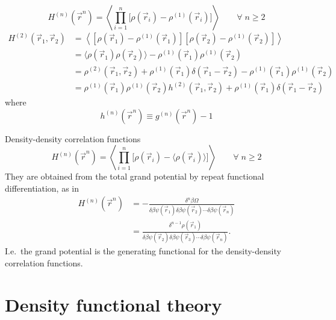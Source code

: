 \documentclass[12pt]{report}
\begin{document}
\begin{equation}
  H^{(n)}(\vec{r}^n) =
  \left\langle
  \prod_{i=1}^n
  \Big[ \rho(\vec{r}_i) - \rho^{(1)}(\vec{r}_i) \Big]
  \right\rangle
  \qquad \forall \; n \ge 2
\end{equation}
\begin{equation}
  \begin{aligned}
    H^{(2)}(\vec{r}_1, \vec{r}_2) &=
    \left\langle
    \left[ \rho(\vec{r}_1) - \rho^{(1)}(\vec{r}_1) \right]
    \left[ \rho(\vec{r}_2) - \rho^{(1)}(\vec{r}_2) \right]
    \right\rangle \\
    &=
    \big\langle \rho(\vec{r}_1) \rho(\vec{r}_2) \big\rangle -
    \rho^{(1)}(\vec{r}_1) \rho^{(1)}(\vec{r}_2) \\
    &=
    \rho^{(2)}(\vec{r}_1, \vec{r}_2) +
    \rho^{(1)}(\vec{r}_1) \delta(\vec{r}_1 - \vec{r}_2) -
    \rho^{(1)}(\vec{r}_1) \rho^{(1)}(\vec{r}_2) \\
    &=
    \rho^{(1)}(\vec{r}_1) \rho^{(1)}(\vec{r}_2) h^{(2)}(\vec{r}_1, \vec{r}_2)
    +
    \rho^{(1)}(\vec{r}_1) \delta(\vec{r}_1 - \vec{r}_2)
  \end{aligned}
\end{equation}
where
\begin{equation}
  h^{(n)}(\vec{r}^n) \equiv g^{(n)}(\vec{r}^n) - 1
\end{equation}

Density-density correlation functions
\begin{equation}
  H^{(n)}(\vec{r}^n) =
  \left\langle
  \prod_{i=1}^n
  \Big[ \rho(\vec{r}_i) - \big\langle\rho(\vec{r}_i)\big\rangle \Big]
  \right\rangle
  \qquad \forall \; n \ge 2
\end{equation}
They are obtained from the total grand potential by repeat functional differentiation, as in
\begin{equation}
  \begin{aligned}
  H^{(n)}(\vec{r}^n) &=
  - \frac{\delta^n \beta \Omega}{\delta \beta\psi(\vec{r}_1) \delta \beta\psi(\vec{r}_2) \cdots \delta \beta\psi(\vec{r}_n)} \\
  &=
  \frac{\delta^{n-1} \rho(\vec{r}_1)}{\delta \beta\psi(\vec{r}_2) \delta \beta\psi(\vec{r}_3) \cdots \delta \beta\psi(\vec{r}_n)}.
  \end{aligned}
\end{equation}
I.e.\ the grand potential is the generating functional for the density-density correlation functions.

\section{Density functional theory}
\end{document}
